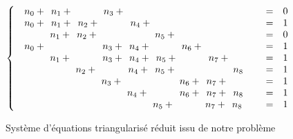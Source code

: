 \documentclass[10pt,a2paper]{article}
\begin{document}
\vspace{2em}$\left\{\begin{array}{l c l}\phantom{0}n_{0} +\phantom{0}n_{1} +\phantom{ 0n_{2} +\ } \phantom{0}n_{3} +\phantom{ 0n_{4} +\ } \phantom{ 0n_{5} +\ } \phantom{ 0n_{6} +\ } \phantom{ 0n_{7} +\ } \phantom{ 0n_{8} +\ }&=& 0\\\phantom{0}n_{0} +\phantom{0}n_{1} +\phantom{0}n_{2} +\phantom{ 0n_{3} +\ } \phantom{0}n_{4} +\phantom{ 0n_{5} +\ } \phantom{ 0n_{6} +\ } \phantom{ 0n_{7} +\ } \phantom{ 0n_{8} +\ }&=& 1\\\phantom{ 0n_{0} +\ } \phantom{0}n_{1} +\phantom{0}n_{2} +\phantom{ 0n_{3} +\ } \phantom{ 0n_{4} +\ } \phantom{0}n_{5} +\phantom{ 0n_{6} +\ } \phantom{ 0n_{7} +\ } \phantom{ 0n_{8} +\ }&=& 0\\\phantom{0}n_{0} +\phantom{ 0n_{1} +\ } \phantom{ 0n_{2} +\ } \phantom{0}n_{3} +\phantom{0}n_{4} +\phantom{ 0n_{5} +\ } \phantom{0}n_{6} +\phantom{ 0n_{7} +\ } \phantom{ 0n_{8} +\ }&=& 1\\\phantom{ 0n_{0} +\ } \phantom{0}n_{1} +\phantom{ 0n_{2} +\ } \phantom{0}n_{3} +\phantom{0}n_{4} +\phantom{0}n_{5} +\phantom{ 0n_{6} +\ } \phantom{0}n_{7} +\phantom{ 0n_{8} +\ }&=& 1\\\phantom{ 0n_{0} +\ } \phantom{ 0n_{1} +\ } \phantom{0}n_{2} +\phantom{ 0n_{3} +\ } \phantom{0}n_{4} +\phantom{0}n_{5} +\phantom{ 0n_{6} +\ } \phantom{ 0n_{7} +\ } \phantom{0}n_{8} &=& 1\\\phantom{ 0n_{0} +\ } \phantom{ 0n_{1} +\ } \phantom{ 0n_{2} +\ } \phantom{0}n_{3} +\phantom{ 0n_{4} +\ } \phantom{ 0n_{5} +\ } \phantom{0}n_{6} +\phantom{0}n_{7} +\phantom{ 0n_{8} +\ }&=& 1\\\phantom{ 0n_{0} +\ } \phantom{ 0n_{1} +\ } \phantom{ 0n_{2} +\ } \phantom{ 0n_{3} +\ } \phantom{0}n_{4} +\phantom{ 0n_{5} +\ } \phantom{0}n_{6} +\phantom{0}n_{7} +\phantom{0}n_{8} &=& 1\\\phantom{ 0n_{0} +\ } \phantom{ 0n_{1} +\ } \phantom{ 0n_{2} +\ } \phantom{ 0n_{3} +\ } \phantom{ 0n_{4} +\ } \phantom{0}n_{5} +\phantom{ 0n_{6} +\ } \phantom{0}n_{7} +\phantom{0}n_{8} &=& 1\\\end{array}\right.$

\newpage\begin{LARGE}Système d'équations triangularisé réduit issu de notre problème\end{LARGE}
\end{document}
